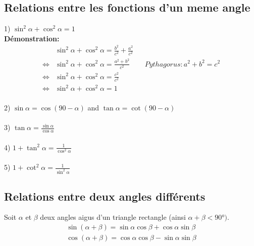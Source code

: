 \documentclass[12pt]{article}
\begin{document}
\subsection{Relations entre les fonctions d'un meme angle}
1) $\sin^2 \alpha + \cos^2 \alpha = 1$\\
\textbf{Démonstration:}
\begin{align*}
  &\sin^2{\alpha}  + \cos^2{\alpha} = \frac{b^2}{c^2} + \frac{a^2}{c^2}\\
  \Leftrightarrow &\sin^2{\alpha}  + \cos^2{\alpha} = \frac{a^2+b^2}{c^2} && Pythagorus: a^2 + b^2 = c^2\\
  \Leftrightarrow &\sin^2{\alpha}  + \cos^2{\alpha} = \frac{c^2}{c^2}\\ 
  \Leftrightarrow &\sin^2{\alpha}  + \cos^2{\alpha} = 1 
\end{align*}
\\
2) $\sin \alpha = \cos(90 - \alpha)$ and $\tan \alpha = \cot(90 - \alpha)$\\
\\
3) $\tan \alpha = \frac{\sin \alpha}{\cos \alpha}$\\
\\
4) $1 + \tan^2 \alpha = \frac{1}{\cos^2 \alpha}$\\
\\
5) $1 + \cot^2 \alpha = \frac{1}{\sin^2 \alpha}$

\subsection{Relations entre deux angles différents}
Soit $\alpha$ et $\beta$ deux angles aigus d'un triangle rectangle (ainsi $\alpha + \beta < \ang{90})$.\\
\begin{align}
  \sin(\alpha + \beta) = \sin \alpha \cos \beta + \cos\alpha \sin \beta\\ \cos(\alpha + \beta) = \cos \alpha \cos \beta - \sin\alpha \sin\beta
\end{align}  
\end{document}
